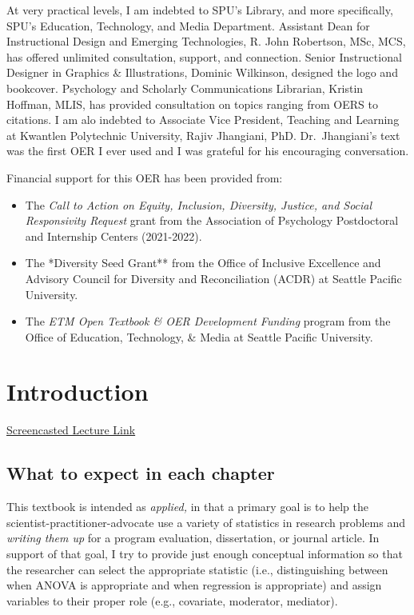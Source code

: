 \documentclass[
  english,
]{book}
\providecommand{\tightlist}{%
  \setlength{\itemsep}{0pt}\setlength{\parskip}{0pt}}
\begin{document}
At very practical levels, I am indebted to SPU's Library, and more specifically, SPU's Education, Technology, and Media Department. Assistant Dean for Instructional Design and Emerging Technologies, R. John Robertson, MSc, MCS, has offered unlimited consultation, support, and connection. Senior Instructional Designer in Graphics \& Illustrations, Dominic Wilkinson, designed the logo and bookcover. Psychology and Scholarly Communications Librarian, Kristin Hoffman, MLIS, has provided consultation on topics ranging from OERS to citations. I am alo indebted to Associate Vice President, Teaching and Learning at Kwantlen Polytechnic University, Rajiv Jhangiani, PhD. Dr.~Jhangiani's text \citeyearpar{jhangiani_research_2019} was the first OER I ever used and I was grateful for his encouraging conversation.

Financial support for this OER has been provided from:

\begin{itemize}
\tightlist
\item
  The \emph{Call to Action on Equity, Inclusion, Diversity, Justice, and Social Responsivity
  Request} grant from the Association of Psychology Postdoctoral and Internship Centers (2021-2022).
\item
  The *Diversity Seed Grant** from the Office of Inclusive Excellence and Advisory Council for Diversity and Reconciliation (ACDR) at Seattle Pacific University.
\item
  The \emph{ETM Open Textbook \& OER Development Funding} program from the Office of Education, Technology, \& Media at Seattle Pacific University.
\end{itemize}

\hypertarget{ReCintro}{%
\chapter{Introduction}\label{ReCintro}}

\href{https://spu.hosted.panopto.com/Panopto/Pages/Viewer.aspx?pid=cc9b7c0d-e5c3-4e4e-a469-acf7013ee761}{Screencasted Lecture Link}

\hypertarget{what-to-expect-in-each-chapter}{%
\section{What to expect in each chapter}\label{what-to-expect-in-each-chapter}}

This textbook is intended as \emph{applied,} in that a primary goal is to help the scientist-practitioner-advocate use a variety of statistics in research problems and \emph{writing them up} for a program evaluation, dissertation, or journal article. In support of that goal, I try to provide just enough conceptual information so that the researcher can select the appropriate statistic (i.e., distinguishing between when ANOVA is appropriate and when regression is appropriate) and assign variables to their proper role (e.g., covariate, moderator, mediator).
\end{document}
